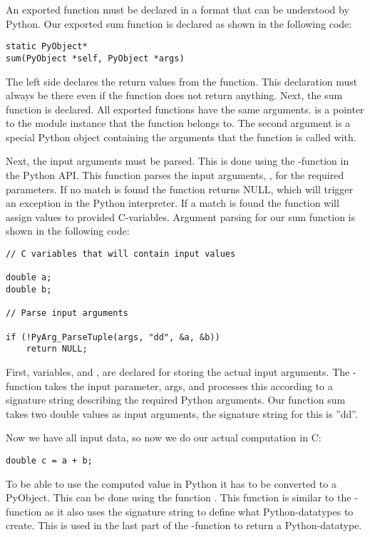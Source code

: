 An exported function must be declared in a format that can be understood by Python. Our exported sum function is declared as shown in the following code:

\cmode

\begin{lstlisting}
static PyObject* 
sum(PyObject *self, PyObject *args)
\end{lstlisting}

The left side declares the return values from the function. This declaration must always be there even if the function does not return anything. Next, the sum function is declared. All exported functions have the same arguments.  is a pointer to the module instance that the function belongs to. The second argument is a special Python object containing the arguments that the function is called with.

Next, the input arguments must be parsed. This is done using the -function in the Python API. This function parses the input arguments, , for the required parameters. If no match is found the function returns NULL, which will trigger an exception in the Python interpreter. If a match is found the function will assign values to provided C-variables. Argument parsing for our sum function is shown in the following code:

\begin{lstlisting}
// C variables that will contain input values

double a;
double b;

// Parse input arguments

if (!PyArg_ParseTuple(args, "dd", &a, &b))
    return NULL;
\end{lstlisting}

First, variables,  and , are declared for storing the actual input arguments. The -function takes the input parameter, args, and processes this according to a signature string describing the required Python arguments. Our function sum takes two double values as input arguments, the signature string for this is ''dd''. 

Now we have all input data, so now we do our actual computation in C:

\begin{lstlisting}
double c = a + b;
\end{lstlisting}

To be able to use the computed value in Python it has to be converted to a PyObject. This can be done using the function . This function is similar to the -function as it also uses the signature string to define what Python-datatypes to create. This is used in the last part of the -function to return a Python-datatype.

